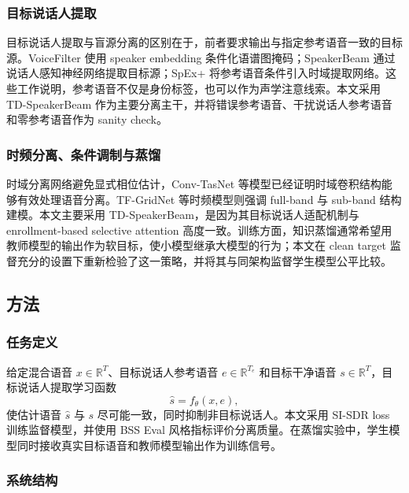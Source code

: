 \documentclass[UTF8,zihao=5,a4paper]{ctexart}
\newcommand{\sisdr}{SI-SDR}
\begin{document}
\subsubsection{目标说话人提取}

目标说话人提取与盲源分离的区别在于，前者要求输出与指定参考语音一致的目标源。VoiceFilter 使用 speaker embedding 条件化语谱图掩码\cite{wang2019voicefilter}；SpeakerBeam 通过说话人感知神经网络提取目标源\cite{zmolikova2019speakerbeam}；SpEx+ 将参考语音条件引入时域提取网络\cite{ge2020spexplus}。这些工作说明，参考语音不仅是身份标签，也可以作为声学注意线索。本文采用 TD-SpeakerBeam 作为主要分离主干，并将错误参考语音、干扰说话人参考语音和零参考语音作为 sanity check。

\subsubsection{时频分离、条件调制与蒸馏}

时域分离网络避免显式相位估计，Conv-TasNet 等模型已经证明时域卷积结构能够有效处理语音分离\cite{luo2019convtasnet}。TF-GridNet 等时频模型则强调 full-band 与 sub-band 结构建模\cite{wang2023tfgridnet}。本文主要采用 TD-SpeakerBeam，是因为其目标说话人适配机制与 enrollment-based selective attention 高度一致。训练方面，知识蒸馏通常希望用教师模型的输出作为软目标，使小模型继承大模型的行为\cite{hinton2015distill}；本文在 clean target 监督充分的设置下重新检验了这一策略，并将其与同架构监督学生模型公平比较。

\subsection{方法}

\subsubsection{任务定义}

给定混合语音 $x\in\mathbb{R}^{T}$、目标说话人参考语音 $e\in\mathbb{R}^{T_e}$ 和目标干净语音 $s\in\mathbb{R}^{T}$，目标说话人提取学习函数
\begin{equation}
    \hat{s}=f_{\theta}(x,e),
\end{equation}
使估计语音 $\hat{s}$ 与 $s$ 尽可能一致，同时抑制非目标说话人。本文采用 \sisdr{} loss 训练监督模型，并使用 BSS Eval 风格指标评价分离质量\cite{vincent2006bss,leroux2019sdr}。在蒸馏实验中，学生模型同时接收真实目标语音和教师模型输出作为训练信号。

\subsubsection{系统结构}
\end{document}
